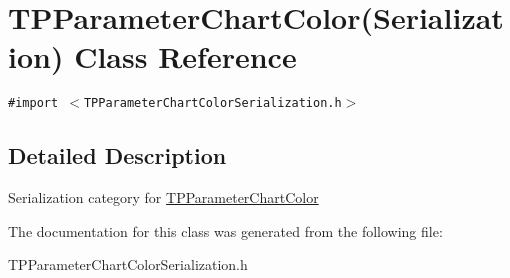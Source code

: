 \hypertarget{interface_t_p_parameter_chart_color_07_serialization_08}{
\section{TPParameterChartColor(Serialization) Class Reference}
\label{interface_t_p_parameter_chart_color_07_serialization_08}
}
{\tt \#import $<$TPParameterChartColorSerialization.h$>$}



\subsection{Detailed Description}
Serialization category for \hyperlink{interface_t_p_parameter_chart_color}{TPParameterChartColor} 

The documentation for this class was generated from the following file:\begin{CompactItemize}
\item 
TPParameterChartColorSerialization.h\end{CompactItemize}
